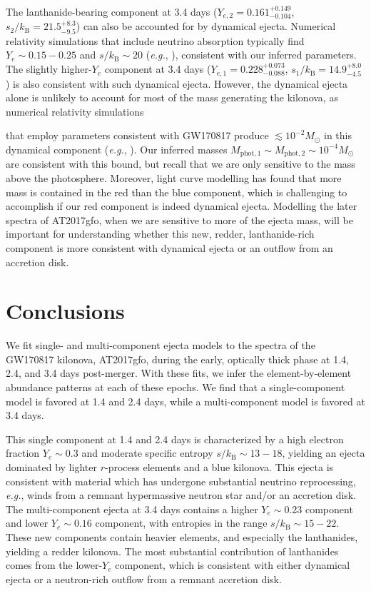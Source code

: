 \documentclass[twocolumn,twocolappendix]{aastex63}
\def\eg{{\it e.g.}}
\begin{document}
The lanthanide-bearing component at 3.4 days ($Y_{e,2} = 0.161^{+0.149}_{-0.104}$, $s_2 / k_{\mathrm{B}} = 21.5^{+8.3}_{-9.5}$) can also be accounted for by dynamical ejecta. Numerical relativity simulations that include neutrino absorption typically find $Y_e \sim 0.15 - 0.25$ and $s / k_{\mathrm{B}} \sim 20$ (\eg, \citealt{zappa23}), consistent with our inferred  parameters. The slightly higher-$Y_e$ component at 3.4 days ($Y_{e,1} = 0.228^{+0.073}_{-0.088}$, $s_1 / k_{\mathrm{B}} = 14.9^{+8.0}_{-4.5}$) is also consistent with such dynamical ejecta. However, the dynamical ejecta alone is unlikely to account for most of the mass generating the kilonova, as numerical relativity simulations {that employ parameters consistent with GW170817 produce $\lesssim 10^{-2} M_{\odot}$ in this dynamical component (\eg, \citealt{shibata17, most19, nedora21}). Our inferred masses $M_{\mathrm{phot},1} \sim M_{\mathrm{phot},2} \sim 10^{-4} M_{\odot}$ are consistent with this bound, but recall that we are only sensitive to the mass above the photosphere. Moreover, light curve modelling has found that more mass is contained in the red than the blue component, which is challenging to accomplish if our red component is indeed dynamical ejecta. Modelling the later spectra of AT2017gfo, when we are sensitive to more of the ejecta mass, will be important for understanding whether this new, redder, lanthanide-rich component is more consistent with dynamical ejecta or an outflow from an accretion disk. 






\section{Conclusions}\label{sec:conco}

We fit single- and multi-component ejecta models to the spectra of the GW170817 kilonova, AT2017gfo, during the early, optically thick phase at 1.4, 2.4, and 3.4 days post-merger. With these fits, we infer the element-by-element abundance patterns at each of these epochs. We find that a single-component model is favored at 1.4 and 2.4 days, while a multi-component model is favored at 3.4 days. 

This single component at 1.4 and 2.4 days is characterized by a high electron fraction $Y_e \sim 0.3$ and moderate specific entropy $s / k_{\mathrm{B}} \sim 13 - 18$, yielding an ejecta dominated by lighter $r$-process elements and a blue kilonova. This ejecta is consistent with material which has undergone substantial neutrino reprocessing, \eg, winds from a remnant hypermassive neutron star and/or an accretion disk. The multi-component ejecta at 3.4 days contains a higher $Y_e \sim 0.23$ component and lower $Y_e \sim 0.16$ component, with entropies in the range $s / k_{\mathrm{B}}\sim 15 - 22$. These new components contain heavier elements, and especially the lanthanides, yielding a redder kilonova. The most substantial contribution of lanthanides comes from the lower-$Y_e$ component, which is consistent with either dynamical ejecta or a neutron-rich outflow from a remnant accretion disk. 

}
\end{document}
